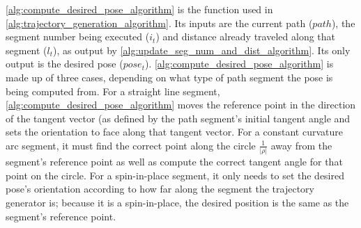 \autoref{alg:compute_desired_pose_algorithm} is the \ComputeDesiredPose function used in \autoref{alg:trajectory_generation_algorithm}. Its inputs are the current path ($path$), the segment number being executed ($i_t$) and distance already traveled along that segment ($l_t$), as output by \autoref{alg:update_seg_num_and_dist_algorithm}. Its only output is the desired pose ($pose_t$). \autoref{alg:compute_desired_pose_algorithm} is made up of three cases, depending on what type of path segment the pose is being computed from. For a straight line segment, \autoref{alg:compute_desired_pose_algorithm} moves the reference point in the direction of the tangent vector (as defined by the path segment's initial tangent angle and sets the orientation to face along that tangent vector. For a constant curvature arc segment, it must find the correct point along the circle $\frac{1}{ | \rho | }$ away from the segment's reference point as well as compute the correct tangent angle for that point on the circle. For a spin-in-place segment, it only needs to set the desired pose's orientation according to how far along the segment the trajectory generator is; because it is a spin-in-place, the desired position is the same as the segment's reference point.

